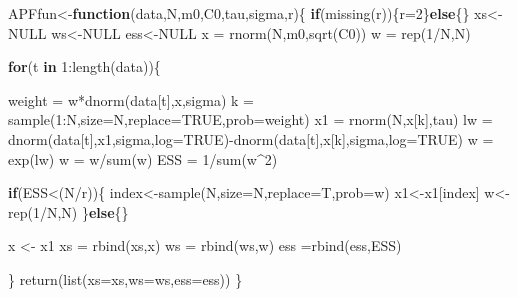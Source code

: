 \documentclass[
]{book}
\newenvironment{Shaded}{\begin{snugshade}}{\end{snugshade}}
\newcommand{\AttributeTok}[1]{\textcolor[rgb]{0.77,0.63,0.00}{#1}}
\newcommand{\ConstantTok}[1]{\textcolor[rgb]{0.00,0.00,0.00}{#1}}
\newcommand{\ControlFlowTok}[1]{\textcolor[rgb]{0.13,0.29,0.53}{\textbf{#1}}}
\newcommand{\DecValTok}[1]{\textcolor[rgb]{0.00,0.00,0.81}{#1}}
\newcommand{\FunctionTok}[1]{\textcolor[rgb]{0.00,0.00,0.00}{#1}}
\newcommand{\NormalTok}[1]{#1}
\newcommand{\OtherTok}[1]{\textcolor[rgb]{0.56,0.35,0.01}{#1}}
\newcommand{\SpecialCharTok}[1]{\textcolor[rgb]{0.00,0.00,0.00}{#1}}
\theoremstyle{break}
\theoremstyle{nonumberplain}
\begin{document}
\begin{Shaded}
\begin{Highlighting}[]
\NormalTok{APFfun}\OtherTok{\textless{}{-}}\ControlFlowTok{function}\NormalTok{(data,N,m0,C0,tau,sigma,r)\{}
  \ControlFlowTok{if}\NormalTok{(}\FunctionTok{missing}\NormalTok{(r))\{r}\OtherTok{=}\DecValTok{2}\NormalTok{\}}\ControlFlowTok{else}\NormalTok{\{\}}
\NormalTok{  xs}\OtherTok{\textless{}{-}}\ConstantTok{NULL}
\NormalTok{  ws}\OtherTok{\textless{}{-}}\ConstantTok{NULL}
\NormalTok{  ess}\OtherTok{\textless{}{-}}\ConstantTok{NULL}
\NormalTok{  x  }\OtherTok{=} \FunctionTok{rnorm}\NormalTok{(N,m0,}\FunctionTok{sqrt}\NormalTok{(C0))}
\NormalTok{  w  }\OtherTok{=} \FunctionTok{rep}\NormalTok{(}\DecValTok{1}\SpecialCharTok{/}\NormalTok{N,N)}
  
  \ControlFlowTok{for}\NormalTok{(t }\ControlFlowTok{in} \DecValTok{1}\SpecialCharTok{:}\FunctionTok{length}\NormalTok{(data))\{}
    
\NormalTok{    weight }\OtherTok{=}\NormalTok{ w}\SpecialCharTok{*}\FunctionTok{dnorm}\NormalTok{(data[t],x,sigma)}
\NormalTok{    k   }\OtherTok{=} \FunctionTok{sample}\NormalTok{(}\DecValTok{1}\SpecialCharTok{:}\NormalTok{N,}\AttributeTok{size=}\NormalTok{N,}\AttributeTok{replace=}\ConstantTok{TRUE}\NormalTok{,}\AttributeTok{prob=}\NormalTok{weight)}
\NormalTok{    x1   }\OtherTok{=} \FunctionTok{rnorm}\NormalTok{(N,x[k],tau)}
\NormalTok{    lw  }\OtherTok{=} \FunctionTok{dnorm}\NormalTok{(data[t],x1,sigma,}\AttributeTok{log=}\ConstantTok{TRUE}\NormalTok{)}\SpecialCharTok{{-}}\FunctionTok{dnorm}\NormalTok{(data[t],x[k],sigma,}\AttributeTok{log=}\ConstantTok{TRUE}\NormalTok{)}
\NormalTok{    w   }\OtherTok{=} \FunctionTok{exp}\NormalTok{(lw)}
\NormalTok{    w   }\OtherTok{=}\NormalTok{ w}\SpecialCharTok{/}\FunctionTok{sum}\NormalTok{(w)}
\NormalTok{    ESS  }\OtherTok{=} \DecValTok{1}\SpecialCharTok{/}\FunctionTok{sum}\NormalTok{(w}\SpecialCharTok{\^{}}\DecValTok{2}\NormalTok{)}
    
    \ControlFlowTok{if}\NormalTok{(ESS}\SpecialCharTok{\textless{}}\NormalTok{(N}\SpecialCharTok{/}\NormalTok{r))\{}
\NormalTok{      index}\OtherTok{\textless{}{-}}\FunctionTok{sample}\NormalTok{(N,}\AttributeTok{size=}\NormalTok{N,}\AttributeTok{replace=}\NormalTok{T,}\AttributeTok{prob=}\NormalTok{w)}
\NormalTok{      x1}\OtherTok{\textless{}{-}}\NormalTok{x1[index]}
\NormalTok{      w}\OtherTok{\textless{}{-}}\FunctionTok{rep}\NormalTok{(}\DecValTok{1}\SpecialCharTok{/}\NormalTok{N,N)}
\NormalTok{    \}}\ControlFlowTok{else}\NormalTok{\{\}}
    
\NormalTok{    x }\OtherTok{\textless{}{-}}\NormalTok{ x1}
\NormalTok{    xs }\OtherTok{=} \FunctionTok{rbind}\NormalTok{(xs,x)}
\NormalTok{    ws }\OtherTok{=} \FunctionTok{rbind}\NormalTok{(ws,w)}
\NormalTok{    ess }\OtherTok{=}\FunctionTok{rbind}\NormalTok{(ess,ESS)}
    
\NormalTok{  \}}
  \FunctionTok{return}\NormalTok{(}\FunctionTok{list}\NormalTok{(}\AttributeTok{xs=}\NormalTok{xs,}\AttributeTok{ws=}\NormalTok{ws,}\AttributeTok{ess=}\NormalTok{ess))}
\NormalTok{\}}
\end{Highlighting}
\end{Shaded}
\end{document}
